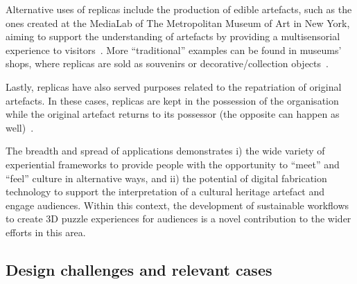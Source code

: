 \documentclass[acmlarge,screen,dvipsnames]{acmart}
\begin{document}
Alternative uses of replicas include the production of edible
artefacts, such as the ones created at the MediaLab of The
Metropolitan Museum of Art in New York, aiming to support the
understanding of artefacts by providing a multisensorial experience to
visitors~\cite{Tang2015}. More ``traditional'' examples can be found
in museums' shops, where replicas are sold as souvenirs or
decorative/collection objects~\cite{Young2017}.

Lastly, replicas have also served purposes related to the repatriation
of original artefacts. In these cases, replicas are kept in the
possession of the organisation while the original artefact returns to
its possessor (the opposite can happen as well)~\cite{Hollinger2013}.
 
The breadth and spread of applications demonstrates i) the wide
variety of experiential frameworks to provide people with the
opportunity to ``meet'' and ``feel'' culture in alternative ways, and
ii) the potential of digital fabrication technology to support the
interpretation of a cultural heritage artefact and engage
audiences. Within this context, the development of sustainable
workflows to create 3D puzzle experiences for audiences is a novel
contribution to the wider efforts in this area.

\subsection{Design challenges and relevant cases}
 
\end{document}
